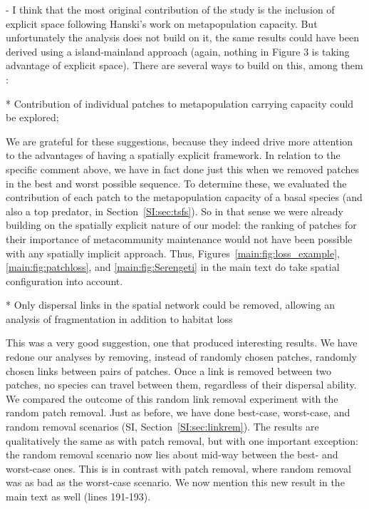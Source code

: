\documentclass[11pt]{article}
\newcommand{\SI}{SI}
\newcommand{\us}{\rm \setlength{\leftskip}{0.3cm} \setlength{\rightskip}{0.3cm}}
\newcommand{\them}{\it \setlength{\leftskip}{0cm} \setlength{\rightskip}{0cm}}
\begin{document}
- I think that the most original contribution of the study is the inclusion of explicit space following Hanski's work on metapopulation capacity. But unfortunately the analysis does not build on it, the same results could have been derived using a island-mainland approach (again, nothing in Figure 3 is taking advantage of explicit space). There are several ways to build on this, among them :

* Contribution of individual patches to metapopulation carrying capacity could be explored;
  
\us

We are grateful for these suggestions, because they indeed drive more attention to the advantages of having a spatially explicit framework. In relation to the specific comment above, we have in fact done just this when we removed patches in the best and worst possible sequence. To determine these, we evaluated the contribution of each patch to the metapopulation capacity of a basal species (and also a top predator, in Section~\ref{SI:sec:tsfs}). So in that sense we were already building on the spatially explicit nature of our model: the ranking of patches for their importance of metacommunity maintenance would not have been possible with any spatially implicit approach. Thus, Figures~\ref{main:fig:loss_example}, \ref{main:fig:patchloss}, and \ref{main:fig:Serengeti} in the main text do take spatial configuration into account.

\them

* Only dispersal links in the spatial network could be removed, allowing an analysis of fragmentation in addition to habitat loss

\us

This was a very good suggestion, one that produced interesting results. We have redone our analyses by removing, instead of randomly chosen patches, randomly chosen links between pairs of patches. Once a link is removed between two patches, no species can travel between them, regardless of their dispersal ability. We compared the outcome of this random link removal experiment with the random patch removal. Just as before, we have done best-case, worst-case, and random removal scenarios (\SI, Section~\ref{SI:sec:linkrem}). The results are qualitatively the same as with patch removal, but with one important exception: the random removal scenario now lies about mid-way between the best- and worst-case ones. This is in contrast with patch removal, where random removal was as bad as the worst-case scenario. We now mention this new result in the main text as well (lines 191-193).
\end{document}
